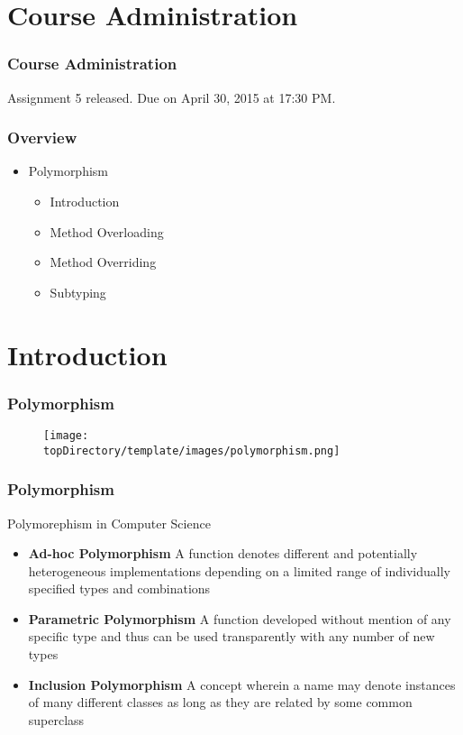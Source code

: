 \documentclass[10pt, compress]{beamer}
\begin{document}
\prepareCover

\section{Course Administration}

\begin{frame}[fragile]
\frametitle{Course Administration}
Assignment 5 released. Due on April 30, 2015 at 17:30 PM.
\end{frame}

\begin{frame}[fragile]
	\frametitle{Overview}
	\begin{itemize}
		\item[] Polymorphism
		\begin{itemize}
			\item[] Introduction
			\item[] Method Overloading
			\item[] Method Overriding
			\item[] Subtyping
		\end{itemize}
	\end{itemize}
\end{frame}


\section{Introduction}

\begin{frame}[fragile]
	\frametitle{Polymorphism}
	\begin{figure}\centering
		\texttt{[image: \\topDirectory/template/images/polymorphism.png]}
	\end{figure}
\end{frame}

\begin{frame}[fragile]
	\frametitle{Polymorphism}
	\begin{block}{Polymorephism in Computer Science}
		\begin{itemize}
			\item[] \textbf{Ad-hoc Polymorphism} A function denotes different and potentially heterogeneous implementations depending on a limited range of individually specified types and combinations
			\item[] \textbf{Parametric Polymorphism} A function developed without mention of any specific type and thus can be used transparently with any number of new types
			\item[] \textbf{Inclusion Polymorphism} A concept wherein a name may denote instances of many different classes as long as they are related by some common superclass
		\end{itemize}
	\end{block}
\end{frame}
\end{document}
